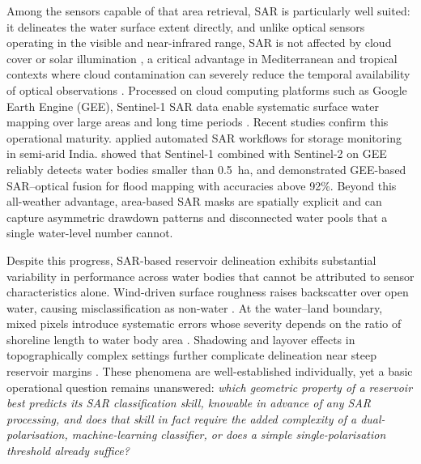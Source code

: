 Among the sensors capable of that area retrieval, SAR is particularly well
suited: it delineates the water surface extent directly, and unlike optical
sensors operating
in the visible and near-infrared range, SAR is not affected by cloud cover
or solar illumination \citep{Torres2012, Mullissa2021}, a critical
advantage in Mediterranean and tropical contexts where cloud contamination
can severely reduce the temporal availability of optical observations
\citep{Pekel2016}. Processed on cloud computing platforms such as Google
Earth Engine (GEE), Sentinel-1 SAR data enable systematic surface water
mapping over large areas and long time periods \citep{Gorelick2017}.
Recent studies confirm this operational maturity. \citet{BhatpuriaEtAl2024}
applied automated SAR workflows for storage monitoring in semi-arid India.
\citet{ValerioEtAl2024} showed that Sentinel-1 combined with Sentinel-2 on
GEE reliably detects water bodies smaller than 0.5~ha, and
\citet{PengEtAl2025} demonstrated GEE-based SAR--optical fusion for flood
mapping with accuracies above 92\%. Beyond this all-weather advantage,
area-based SAR masks are spatially explicit and can capture asymmetric
drawdown patterns and disconnected water pools that a single water-level
number cannot.

Despite this progress, SAR-based reservoir delineation exhibits
substantial variability in performance across water bodies that cannot be
attributed to sensor characteristics alone. Wind-driven surface roughness
raises backscatter over open water, causing misclassification as non-water
\citep{Bioresita2018, PenaLuque2021}. At the water--land boundary,
mixed pixels introduce systematic errors whose severity depends on the
ratio of shoreline length to water body area \citep{PenaLuque2021}.
Shadowing and layover effects in topographically complex settings further
complicate delineation near steep reservoir margins \citep{Martinis2015}.
These phenomena are well-established individually, yet a basic operational
question remains unanswered: \emph{which geometric property of a reservoir best
predicts its SAR classification skill, knowable in advance of any SAR
processing, and does that skill in fact require the added complexity of a
dual-polarisation, machine-learning classifier, or does a simple
single-polarisation threshold already suffice?}

